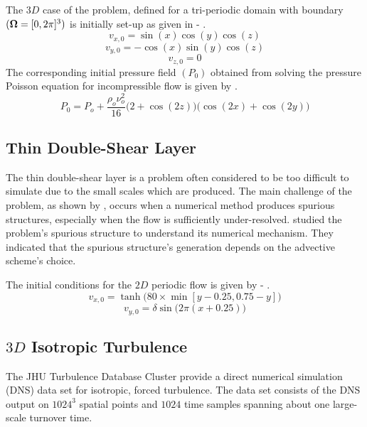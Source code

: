 The $3D$ case of the problem, defined for a tri-periodic domain with boundary $(\bm{\Omega} = [0, 2\pi]^3)$ is initially set-up as given in  - .
\begin{equation}
    v_{x, 0} = \sin(x) \cos(y) \cos(z)
    \label{eq:3d-tgv-vx}
\end{equation}
\begin{equation}
    v_{y, 0} = -\cos(x) \sin(y) \cos(z)
    \label{eq:3d-tgv-vy}
\end{equation}
\begin{equation}
    v_{z, 0} = 0
    \label{eq:3d-tgv-vz}
\end{equation}
The corresponding initial pressure field $(P_0)$ obtained from solving the pressure Poisson equation for incompressible flow is given by  \parencite{pereira2021modeling}.
\begin{equation}
    P_{0} = P_o + \frac{\rho_o \nu_o^2}{16} \bigg(2 + \cos(2z) \bigg) \bigg(\cos(2x) + \cos(2y) \bigg)
    \label{eq:3d-tgv-p}
\end{equation}

\subsection{Thin Double-Shear Layer}
The thin double-shear layer is a problem often considered to be too difficult to simulate due to the small scales which are produced. 
The main challenge of the problem, as shown by \cite{minion1997performance}, occurs when a numerical method produces spurious structures, especially when the flow is sufficiently under-resolved. 
\cite{drikakis2001spurious} studied the problem's spurious structure to understand its numerical mechanism. They indicated that the spurious structure's generation depends on the advective scheme's choice. 

The initial conditions for the $2D$ periodic flow is given by  - .
\begin{equation}
    v_{x, 0} = \tanh \big(80 \times \min[y-0.25, 0.75-y] \big)
    \label{eq:2d-tdsl-vx}
\end{equation}
\begin{equation}
    v_{y, 0} = \delta \sin \big( 2\pi (x+0.25) \big)
    \label{eq:2d-tdsl-vy}
\end{equation}

\subsection[3D Isotropic Turbulence]{$3D$ Isotropic Turbulence}
The JHU Turbulence Database Cluster \parencite{li2008public} provide a direct numerical simulation (DNS) data set for isotropic, forced turbulence. The data set consists of the DNS output on $1024^3$ spatial points and $1024$ time samples spanning about one large-scale turnover time.

